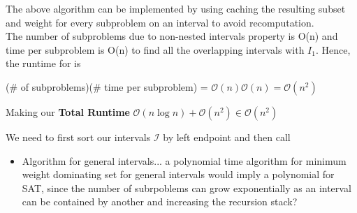 \documentclass{article}
\begin{document}
\begin{solution}
\begin{subproof}[Algorithm]
\begin{quote}
\begin{steps}
\begin{steps}
    \end{steps}

\end{steps}
\end{quote}
\end{subproof}
\begin{subproof}

The above algorithm can be implemented by using caching the resulting subset and weight for every subproblem on an interval  to avoid recomputation.\\
The number of subproblems due to non-nested intervals property is O(n) and time per subproblem is O(n) to find all the overlapping intervals with \( I_1 \). Hence, the runtime for  is \begin{center}
    (\# of subproblems)(\# time per subproblem) = \( \mathcal{O}(n)\mathcal{O}(n) = \mathcal{O}(n^2) \)
\end{center}
Making our \textbf{Total Runtime} \(\mathcal{O}(n\log n) + \mathcal{O}(n^2) \in \mathcal{O}(n^2)\)

\end{subproof}
\begin{subproof} We need to first sort our intervals \( \mathcal{I} \) by left endpoint and then call  

\end{subproof}
\begin{itemize}
    \item \begin{solution}
    Algorithm for general intervals... a polynomial time algorithm for minimum weight dominating set for general intervals would imply a polynomial for SAT, since the number of subrpoblems can grow exponentially as an interval can be contained by another and increasing the recursion stack?
\end{solution}
\end{itemize}

\end{solution}
\pagebreak
\end{document}
